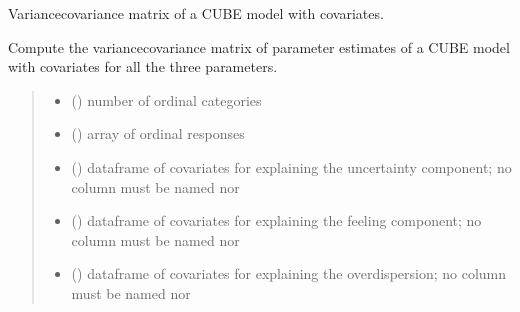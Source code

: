 \documentclass[letterpaper,10pt,english]{sphinxmanual}
\begin{document}
\begin{fulllineitems}
\label{\detokenize{cubmods:cubmods.cube_ywz.varcov}}
\pysigstartsignatures
{}
\pysigstopsignatures
\sphinxAtStartPar
Variance\sphinxhyphen{}covariance matrix of a CUBE model with covariates.

\sphinxAtStartPar
Compute the variance\sphinxhyphen{}covariance matrix of parameter estimates of a CUBE model with covariates
for all the three parameters.
\begin{quote}\begin{description}
\begin{itemize}
\item {} 
\sphinxAtStartPar
{} () \textendash{} number of ordinal categories

\item {} 
\sphinxAtStartPar
{} () \textendash{} array of ordinal responses

\item {} 
\sphinxAtStartPar
{} () \textendash{} dataframe of covariates for explaining the uncertainty component;
no column must be named  nor 

\item {} 
\sphinxAtStartPar
{} () \textendash{} dataframe of covariates for explaining the feeling component;
no column must be named  nor 

\item {} 
\sphinxAtStartPar
{} () \textendash{} dataframe of covariates for explaining the overdispersion;
no column must be named  nor 


\end{itemize}
\end{description}
\end{quote}
\end{fulllineitems}
\end{document}
